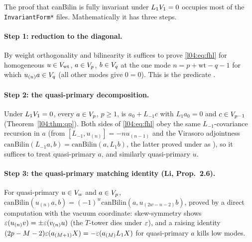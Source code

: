 The proof that canBilin is fully invariant under $L_1V_1 = 0$ occupies most of the
\texttt{InvariantForm*} files. Mathematically it has three steps.

\paragraph{Step 1: reduction to the diagonal.} By weight orthogonality and bilinearity it suffices to
prove \eqref{l04:eq:fhl} for homogeneous $u\in V_{\mathrm{wt}}$, $a\in V_p$, $b\in V_q$ at the one mode
$n = p+\mathrm{wt}-q-1$ for which $u_{(n)}a\in V_q$ (all other modes give $0 = 0$). This is the
predicate .

\paragraph{Step 2: the quasi-primary decomposition.} Under $L_1V_1 = 0$, every $a\in V_p$, $p\ge1$, is
$a_0+L_{-1}c$ with $L_1a_0 = 0$ and $c\in V_{p-1}$ (Theorem~\ref{l04:thm:qp}). Both sides of
\eqref{l04:eq:fhl} obey the same $L_{-1}$-covariance recursion in $a$ (from $[L_{-1},u_{(n)}] =
-nu_{(n-1)}$ and the Virasoro adjointness $\mathrm{canBilin}(L_{-1}a,b) = \mathrm{canBilin}(a,L_1b)$, the
latter proved under  as \allowbreak{}\allowbreak{}), so it suffices to treat quasi-primary $a$,
and similarly quasi-primary $u$.

\paragraph{Step 3: the quasi-primary matching identity (Li, Prop.~2.6).} For quasi-primary $u\in V_w$
and $a\in V_p$, $\mathrm{canBilin}(u_{(n)}a,b) = (-1)^w\mathrm{canBilin}(a,u_{(2w-n-2)}b)$, proved by a
direct computation with the vacuum coordinate: skew-symmetry shows $\varepsilon(u_{(n)}v) = \pm\varepsilon(v_{(n)}u)$
(the $T$-tower dies under $\varepsilon$), and a raising identity $(2p-M-2)\varepsilon(a_{(M+1)}X) =
-\varepsilon(a_{(M)}L_1X)$ for quasi-primary $a$ kills low modes.

